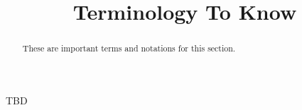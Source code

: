 \documentclass{ximera}
\title{Terminology To Know}
\begin{document}
\begin{abstract}
    These are important terms and notations for this section.
\end{abstract}
\maketitle

TBD

%
%
%
%
\end{document}
